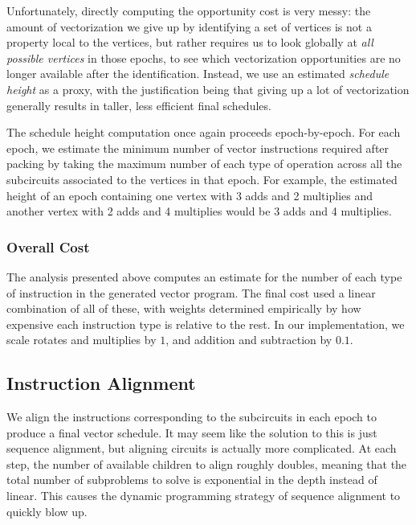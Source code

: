 Unfortunately, directly computing the opportunity cost is very messy: the amount of vectorization we give up by identifying a set of vertices is not a property local to the vertices, but rather requires us to look globally at {\em all possible vertices} in those epochs, to see which vectorization opportunities are no longer available after the identification.
Instead, we use an estimated {\em schedule height} as a proxy, with the justification being that giving up a lot of vectorization generally results in taller, less efficient final schedules. 

The schedule height computation once again proceeds epoch-by-epoch.
For each epoch, we estimate the minimum number of vector instructions required after packing by taking the maximum number of each type of operation across all the subcircuits associated to the vertices in that epoch.
For example, the estimated height of an epoch containing one vertex with 3 adds and 2 multiplies and another vertex with 2 adds and 4 multiplies would be 3 adds and 4 multiplies.

\subsubsection*{Overall Cost}
The analysis presented above computes an estimate for the number of each type of instruction in the generated vector program.
The final cost used a linear combination of all of these, with weights determined empirically by how expensive each instruction type is relative to the rest.
In our implementation, we scale rotates and multiplies by $1$, and addition and subtraction by $0.1$. 

\subsection{Instruction Alignment}\label{sec:instruction-alignment}
We align the instructions corresponding to the subcircuits in each epoch to produce a final vector schedule.
It may seem like the solution to this is just sequence alignment, but aligning circuits is actually more complicated.
At each step, the number of available children to align roughly doubles, meaning that the total number of subproblems to solve is exponential in the depth instead of linear. 
This causes the dynamic programming strategy of sequence alignment to quickly blow up.

